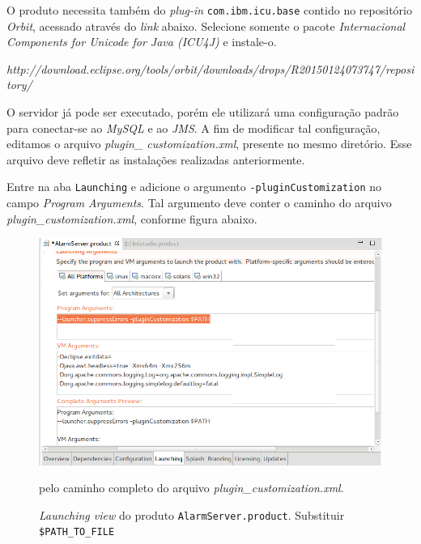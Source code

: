 \begin{enumerate}[i.]
O produto necessita também do \textit{plug-in} \texttt{com.ibm.icu.base} contido
no repositório \textit{Orbit}, acessado através do \textit{link} abaixo.
Selecione somente o pacote \textit{Internacional Components for Unicode for
Java (ICU4J)} e instale-o.

\begin{center}
\textit{http://download.eclipse.org/tools/orbit/downloads/drops/R20150124073747/repository/}
\end{center}

O servidor já pode ser executado, porém ele utilizará uma configuração padrão
para conectar-se ao \textit{MySQL} e ao \textit{JMS}. A fim de modificar tal
configuração, editamos o arquivo \textit{plugin\_ customization.xml}, presente
no mesmo diretório. Esse arquivo deve refletir as instalações realizadas
anteriormente. 

\vspace{12pt}

Entre na aba \texttt{Launching} e adicione o argumento
\texttt{-pluginCustomization} no campo \textit{Program Arguments}. Tal argumento
deve conter o caminho do arquivo \textit{plugin\_customization.xml}, conforme
figura abaixo.

\FloatBarrier

\begin{figure}[h]

\centering
\includegraphics[scale=0.40]{image/launch-view}
\caption {\textit{Launching view} do produto \texttt{AlarmServer.product}.
Substituir \texttt{\$PATH\_TO\_FILE}} pelo caminho completo do arquivo
\textit{plugin\_customization.xml}.
\label{img:launch-view} 
\end{figure}


\end{enumerate}
